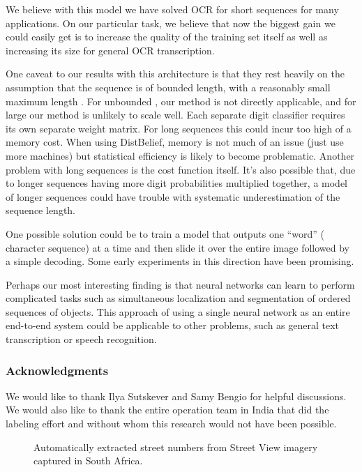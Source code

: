 \documentclass{article} \usepackage{comment}
\begin{document}
We believe with this model we have solved OCR for short sequences for many applications.
On our particular task, we believe that now the biggest gain we could easily get is to
increase the quality of the training set itself as well as increasing its size for general OCR transcription.

One caveat to our results with this architecture is that they rest heavily on the assumption that
the sequence is of bounded length, with a reasonably small maximum length .
For unbounded , our method is not directly applicable, and for large  our
method is unlikely to scale well. Each separate digit classifier requires its own
separate weight matrix. For long sequences this could incur too high of a memory
cost. When using DistBelief, memory is not much of an issue (just use more machines)
but statistical efficiency is likely to become problematic. Another problem with long sequences is the
cost function itself. It's also possible that, due to longer sequences having more
digit probabilities multiplied together, a model of longer sequences could have trouble
with systematic underestimation of the sequence length.

One possible solution could be
to train a model that outputs one ``word'' ( character sequence) at a time and then slide it over
the entire image followed by a simple decoding. Some early experiments in this direction have been
promising.

Perhaps our most interesting finding is that neural networks can learn to perform
complicated tasks such as simultaneous localization and segmentation of ordered
sequences of objects. This approach of using a single
neural network as an entire end-to-end system could be applicable to other problems,
such as general text transcription or speech recognition.

\clearpage

\subsubsection*{Acknowledgments}

We would like to thank Ilya Sutskever and Samy Bengio for helpful discussions.
We would also like to thank the entire operation team in India that did the labeling effort and without whom this research would not have been possible.
\small




\begin{figure}[hb]
\begin{centering}
\caption{Automatically extracted street numbers from Street View imagery captured in South Africa.}
\label{fig:geocoding}
\end{centering}
\end{figure}
\end{document}
